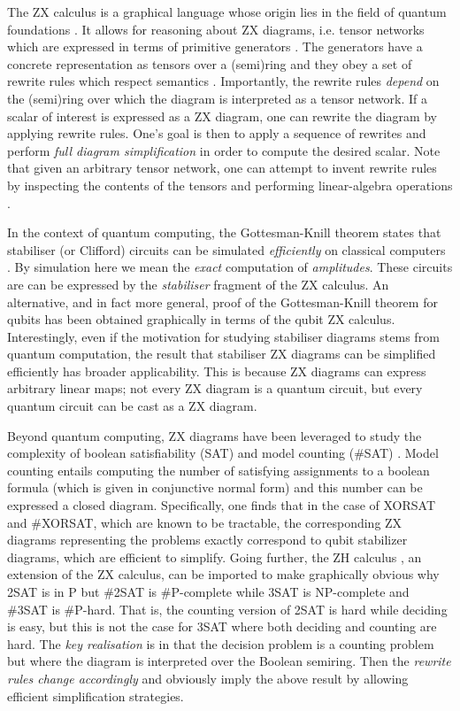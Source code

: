 \documentclass[submission,copyright,creativecommons]{eptcs}
\begin{document}
The ZX calculus is a graphical language whose origin lies in the field of quantum foundations \cite{Coecke2011}.
It allows for reasoning about ZX diagrams, i.e. tensor networks which are expressed in terms of primitive generators \cite{vandewetering2020zxcalculus}.
The generators have a concrete representation as tensors over
a (semi)ring and they obey a set of rewrite rules which respect semantics \cite{wang2020completeness}.
Importantly, the rewrite rules \emph{depend} on the (semi)ring over which the diagram is interpreted as a tensor network.
If a scalar of interest is expressed as a ZX diagram,
one can rewrite the diagram by applying rewrite rules.
One's goal is then to apply a sequence of rewrites and perform \emph{full diagram simplification} in order to compute the desired scalar.
Note that
given an arbitrary tensor network, one can attempt to invent rewrite rules by inspecting the contents of the tensors and performing linear-algebra operations \cite{gray2020hyperoptimized}.

In the context of quantum computing,
the Gottesman-Knill theorem states that stabiliser (or Clifford) circuits can be
simulated \emph{efficiently} on classical computers \cite{Aaronson2004}.
By simulation here we mean the \emph{exact} computation of \emph{amplitudes}.
These circuits are can be expressed by the \emph{stabiliser} fragment of the ZX calculus.
An alternative, and in fact more general, proof of the Gottesman-Knill theorem for qubits has been obtained graphically in terms of the qubit ZX calculus.
Interestingly, even if the motivation for studying stabiliser diagrams stems from quantum computation, the result that stabiliser ZX diagrams can be simplified efficiently has broader applicability. This is because
ZX diagrams can express arbitrary linear maps; not every ZX diagram is a quantum circuit, but every quantum circuit can be cast as a ZX diagram.

Beyond quantum computing, ZX diagrams have been leveraged to study the complexity of boolean satisfiability (SAT) and model counting (\#SAT) \cite{debeaudrap2020tensor}.
Model counting entails computing the number of satisfying assignments to a boolean formula (which is given in conjunctive normal form)
and this number can be expressed a closed diagram.
Specifically, one finds that in the case of XORSAT and \#XORSAT,
which are known to be tractable,
the corresponding ZX diagrams representing the problems exactly correspond to qubit stabilizer diagrams, which are efficient to simplify.
Going further, the ZH calculus \cite{backens2018zh}, an extension of the ZX calculus, can be imported to make graphically obvious
why 2SAT is in P but \#2SAT is \#P-complete while 3SAT is NP-complete and \#3SAT is \#P-hard.
That is, the counting version of 2SAT is hard while deciding is easy, but this is not the case for 3SAT where both deciding and counting are hard.
The \emph{key realisation} is in that the decision problem is a counting problem
but where the diagram is interpreted over the Boolean semiring.
Then the \emph{rewrite rules change accordingly} and obviously imply the above result by allowing efficient simplification strategies.
\end{document}
